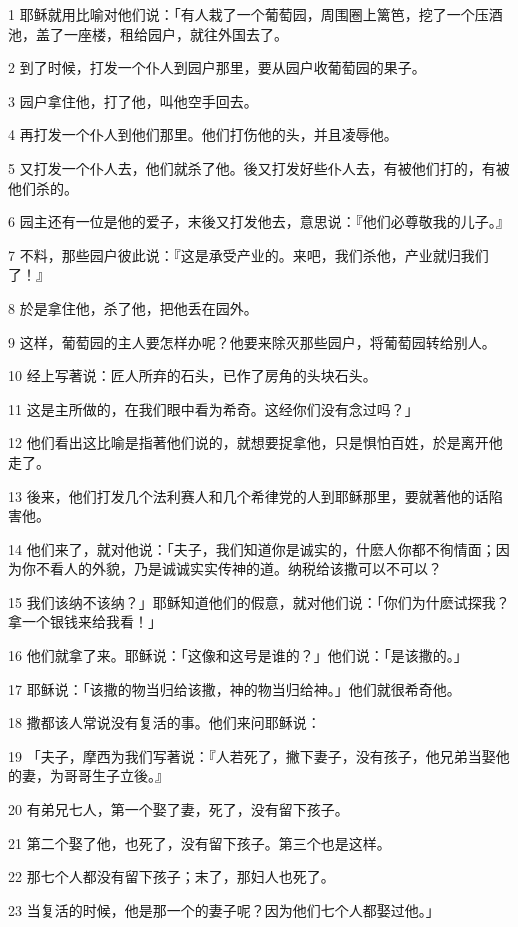 \par 1 耶稣就用比喻对他们说：「有人栽了一个葡萄园，周围圈上篱笆，挖了一个压酒池，盖了一座楼，租给园户，就往外国去了。
\par 2 到了时候，打发一个仆人到园户那里，要从园户收葡萄园的果子。
\par 3 园户拿住他，打了他，叫他空手回去。
\par 4 再打发一个仆人到他们那里。他们打伤他的头，并且凌辱他。
\par 5 又打发一个仆人去，他们就杀了他。後又打发好些仆人去，有被他们打的，有被他们杀的。
\par 6 园主还有一位是他的爱子，末後又打发他去，意思说：『他们必尊敬我的儿子。』
\par 7 不料，那些园户彼此说：『这是承受产业的。来吧，我们杀他，产业就归我们了！』
\par 8 於是拿住他，杀了他，把他丢在园外。
\par 9 这样，葡萄园的主人要怎样办呢？他要来除灭那些园户，将葡萄园转给别人。
\par 10 经上写著说：匠人所弃的石头，已作了房角的头块石头。
\par 11 这是主所做的，在我们眼中看为希奇。这经你们没有念过吗？」
\par 12 他们看出这比喻是指著他们说的，就想要捉拿他，只是惧怕百姓，於是离开他走了。
\par 13 後来，他们打发几个法利赛人和几个希律党的人到耶稣那里，要就著他的话陷害他。
\par 14 他们来了，就对他说：「夫子，我们知道你是诚实的，什麽人你都不徇情面；因为你不看人的外貌，乃是诚诚实实传神的道。纳税给该撒可以不可以？
\par 15 我们该纳不该纳？」耶稣知道他们的假意，就对他们说：「你们为什麽试探我？拿一个银钱来给我看！」
\par 16 他们就拿了来。耶稣说：「这像和这号是谁的？」他们说：「是该撒的。」
\par 17 耶稣说：「该撒的物当归给该撒，神的物当归给神。」他们就很希奇他。
\par 18 撒都该人常说没有复活的事。他们来问耶稣说：
\par 19 「夫子，摩西为我们写著说：『人若死了，撇下妻子，没有孩子，他兄弟当娶他的妻，为哥哥生子立後。』
\par 20 有弟兄七人，第一个娶了妻，死了，没有留下孩子。
\par 21 第二个娶了他，也死了，没有留下孩子。第三个也是这样。
\par 22 那七个人都没有留下孩子；末了，那妇人也死了。
\par 23 当复活的时候，他是那一个的妻子呢？因为他们七个人都娶过他。」
